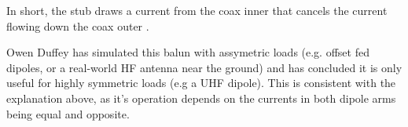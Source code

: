 \documentclass{article}
\begin{document}
In short, the stub draws a current from the coax inner that cancels the current flowing down the coax outer \cite{antenna_theory}.

Owen Duffey \cite{duffey} has simulated this balun with assymetric loads (e.g. offset fed dipoles, or a real-world HF antenna near the ground) and has concluded it is only useful for highly symmetric loads (e.g a UHF dipole).  This is consistent with the explanation above, as it's operation depends on the currents in both dipole arms being equal and opposite.



\end{document}

